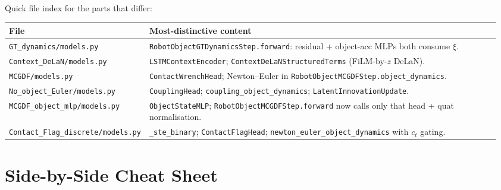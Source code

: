 \documentclass[11pt]{article}
\begin{document}
Quick file index for the parts that differ:

\begin{center}
\small
\begin{tabular}{p{0.22\linewidth} p{0.74\linewidth}}
\toprule
File & Most-distinctive content \\
\midrule
\texttt{GT\_dynamics/models.py}                          & \texttt{RobotObjectGTDynamicsStep.forward}: residual + object-acc MLPs both consume $\xi$. \\
\texttt{Context\_DeLaN/models.py}                        & \texttt{LSTMContextEncoder}; \texttt{ContextDeLaNStructuredTerms} (FiLM-by-$z$ DeLaN). \\
\texttt{MCGDF/models.py}                                 & \texttt{ContactWrenchHead}; Newton--Euler in \texttt{RobotObjectMCGDFStep.object\_dynamics}. \\
\texttt{No\_object\_Euler/models.py}                     & \texttt{CouplingHead}; \texttt{coupling\_object\_dynamics}; \texttt{LatentInnovationUpdate}. \\
\texttt{MCGDF\_object\_mlp/models.py}                    & \texttt{ObjectStateMLP}; \texttt{RobotObjectMCGDFStep.forward} now calls only that head + quat normalisation. \\
\texttt{Contact\_Flag\_discrete/models.py}               & \texttt{\_ste\_binary}; \texttt{ContactFlagHead}; \texttt{newton\_euler\_object\_dynamics} with $c_t$ gating. \\
\bottomrule
\end{tabular}
\end{center}

\section{Side-by-Side Cheat Sheet}
\end{document}
